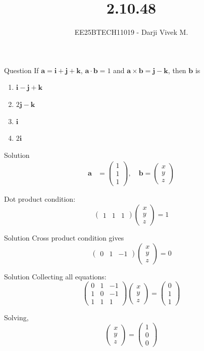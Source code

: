 \documentclass{beamer}
\title{2.10.48}
\author{EE25BTECH11019 - Darji Vivek M.}
\date{}
\newcommand{\myvec}[1]{\begin{pmatrix}#1\end{pmatrix}}
\renewcommand{\vec}[1]{\mathbf{#1}}
\begin{document}
\frame{\titlepage}

\begin{frame}{Question}
If $\vec{a} = \vec{i}+\vec{j}+\vec{k}$, $\vec{a}\cdot\vec{b}=1$ and $\vec{a}\times\vec{b}=\vec{j}-\vec{k}$, then $\vec{b}$ is 
\begin{multicols}{2}
\begin{enumerate}[label=(\alph*)]
\item $\vec{i}-\vec{j}+\vec{k}$  
\item $2\vec{j}-\vec{k}$  
\item $\vec{i}$  
\item $2\vec{i}$  
\end{enumerate}
\end{multicols}
\end{frame}

\begin{frame}{Solution}
\begin{align}
\vec{a} &= \myvec{1\\1\\1}, \quad 
\vec{b} = \myvec{x\\y\\z}
\end{align}

Dot product condition:
\[
\myvec{1 & 1 & 1}\myvec{x\\y\\z}=1
\]
\end{frame}

\begin{frame}{Solution}
Cross product condition gives
\[
\myvec{0 & 1 & -1}\myvec{x\\y\\z}=0
\]
\end{frame}

\begin{frame}{Solution}
Collecting all equations:
\[
\myvec{0 & 1 & -1\\ 1 & 0 & -1\\ 1 & 1 & 1}\myvec{x\\y\\z}=\myvec{0\\1\\1}
\]

Solving,
\[
\myvec{x\\y\\z}=\myvec{1\\0\\0}
\]
\end{frame}
\end{document}
